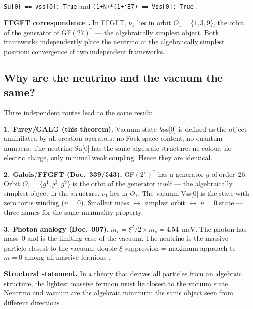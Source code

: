 \texttt{Su[0] == Vss[0]: True} and \texttt{(1+N)*(1+jE7) == Vss[0]: True} \BM.

\textbf{FFGFT correspondence \BM.} In FFGFT, $\nu_1$ lies in orbit $O_1=\{1,3,9\}$, the orbit
of the generator of GF$(27)^*$ --- the algebraically simplest object. Both frameworks
independently place the neutrino at the algebraically simplest position: convergence of
two independent frameworks.

\subsection*{Why are the neutrino and the vacuum the same?}

Three independent routes lead to the same result:

\textbf{1. Furey/GALG (this theorem).}
Vacuum state Vss[0] is defined as the object annihilated by all creation operators:
no Fock-space content, no quantum numbers. The neutrino Su[0] has the same
algebraic structure: no colour, no electric charge, only minimal weak coupling.
Hence they are identical.

\textbf{2. Galois/FFGFT (Doc.~339/343).}
GF$(27)^*$ has a generator $g$ of order~26.
Orbit $O_1=\{g^1,g^3,g^9\}$ is the orbit of the generator itself ---
the algebraically simplest object in the structure. $\nu_1$ lies in $O_1$.
The vacuum Vss[0] is the state with zero torus winding ($n=0$).
Smallest mass $\leftrightarrow$ simplest orbit $\leftrightarrow$ $n=0$ state ---
three names for the same minimality property.

\textbf{3. Photon analogy (Doc.~007).}
$m_\nu = \xi^2/2 \times m_e = 4.54$~meV. The photon has mass~0
and is the limiting case of the vacuum. The neutrino is the massive particle
closest to the vacuum: double $\xi$ suppression = maximum approach to $m=0$
among all massive fermions \KM.

\textbf{Structural statement.}
In a theory that derives all particles from an algebraic structure, the lightest
massive fermion must lie closest to the vacuum state.
Neutrino and vacuum are the algebraic minimum: the same object seen from
different directions \BM.


